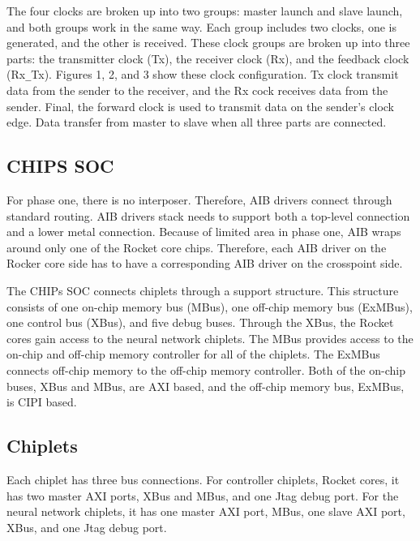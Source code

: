 \documentclass[../main.tex]{subfiles}
\begin{document}
The four clocks are broken up into two groups: master launch and slave launch, and both groups work in the same way. Each group includes two clocks, one is generated, and the other is received. These clock groups are broken up into three parts: the transmitter clock (Tx), the receiver clock (Rx), and the feedback clock (Rx\texttt{\_}Tx). Figures 1, 2, and 3 show these clock configuration. Tx clock transmit data from the sender to the receiver, and the Rx cock receives data from the sender. Final, the forward clock is used to transmit data on the sender's clock edge. Data transfer from master to slave when all three parts are connected.

\subsection{CHIPS SOC}
For phase one, there is no interposer. Therefore, AIB drivers connect through standard routing. AIB drivers stack needs to support both a top-level connection and a lower metal connection.  Because of limited area in phase one, AIB wraps around only one of the Rocket core chips. Therefore, each AIB driver on the Rocker core side has to have a corresponding AIB driver on the crosspoint side.

The CHIPs SOC connects chiplets through a support structure. This structure consists of one on-chip memory bus (MBus), one off-chip memory bus (ExMBus), one control bus (XBus), and five debug buses.  Through the XBus, the Rocket cores gain access to the neural network chiplets. The MBus provides access to the on-chip and off-chip memory controller for all of the chiplets. The ExMBus connects off-chip memory to the off-chip memory controller.  Both of the on-chip buses, XBus and MBus, are AXI based, and the off-chip memory bus, ExMBus, is CIPI based. 

\subsection{Chiplets}
Each chiplet has three bus connections. For controller chiplets, Rocket cores, it has two master AXI ports, XBus and MBus, and one Jtag debug port. For the neural network chiplets, it has one master AXI port, MBus, one slave AXI port, XBus, and one Jtag debug port.

\end{document}
